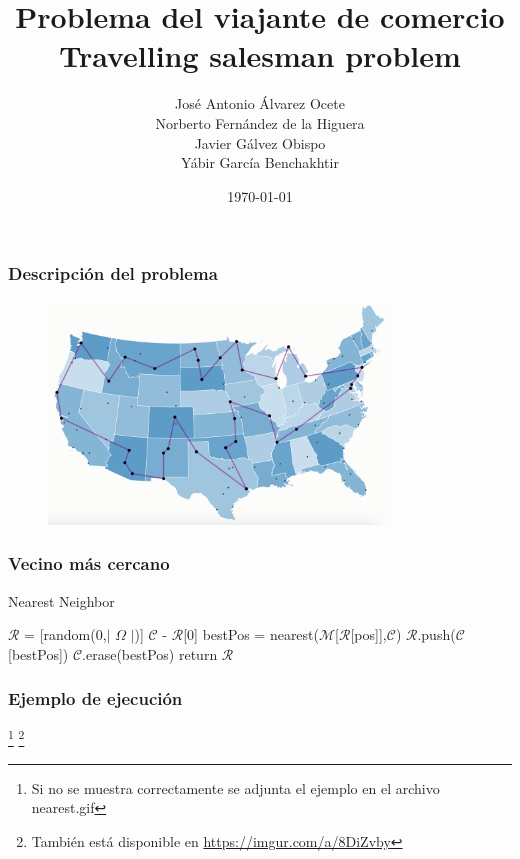 \documentclass[spanish]{beamer}
\title{Problema del viajante de comercio\\
Travelling salesman problem}
\date{\today}
\author{José Antonio Álvarez Ocete \\ Norberto Fernández de la Higuera \\ Javier Gálvez Obispo \\ Yábir García Benchakhtir}
\institute{Doble Grado en Ingeniería Informática y Matemáticas}
\begin{document}
\frame{\titlepage}

\begin{frame}\frametitle{Descripción del problema}

  \begin{figure}[H]
    \centering
    \includegraphics[width=0.8\textwidth]{mapa.png}
  \end{figure}
  
\end{frame}

\begin{frame}\frametitle{Vecino más cercano}
  
  \begin{algorithm}[H]
    \caption{Nearest Neighbor}
    \begin{algorithmic}
      \State $\mathcal{R}$ = [random(0,$|$ $\Omega$ $|$)]
      \State $\mathcal{C}$ - $\mathcal{R}$[0]
      \State bestPos = nearest($\mathcal{M}$[$\mathcal{R}$[pos]],$\mathcal{C}$)
      \State $\mathcal{R}$.push($\mathcal{C}$[bestPos])
      \State $\mathcal{C}$.erase(bestPos)
      \EndFor
      \State return $\mathcal{R}$
    \end{algorithmic}
  \end{algorithm}

\end{frame}

\begin{frame}\frametitle{Ejemplo de ejecución}
  \footnote[1]{Si no se muestra correctamente se adjunta el ejemplo en el archivo nearest.gif}
  \footnote[2]{También está disponible en \href{https://imgur.com/a/8DiZvby}{https://imgur.com/a/8DiZvby}}
\end{frame}
\end{document}
